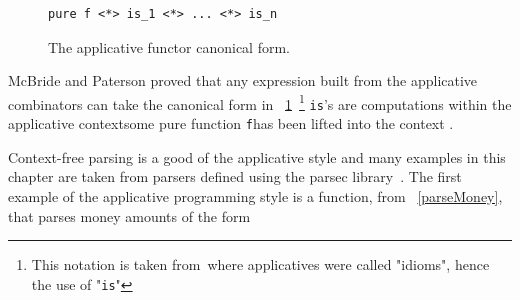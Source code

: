 \begin{figure}[t]
\begin{lstlisting}
pure f <*> is_1 <*> ... <*> is_n
\end{lstlisting}
\caption{The applicative functor \DIFaddbeginFL {}\DIFaddendFL canonical form.}
\label{canonForm}
\end{figure}

McBride and Paterson proved that any expression built from the applicative combinators can take the \DIFdelbegin {}\DIFdelend canonical form in \DIFdelbegin {}\DIFdelend \DIFaddbegin {}\DIFaddend ~\ref{canonForm}~\DIFdelbegin {}\DIFdelend \DIFaddbegin {}\DIFaddend \footnote{This notation is taken from~\DIFdelbegin {}\DIFdelend \DIFaddbegin {}\DIFaddend where applicatives were called "idioms", hence the use of "\texttt{is}"\DIFaddbegin {}\DIFaddend } \DIFdelbegin {}\DIFdelend \DIFaddbegin {}\DIFaddend \texttt{is}'s \DIFaddbegin {}\DIFaddend are computations within the applicative context\DIFdelbegin {}\DIFdelend \DIFaddbegin {}\DIFaddend some pure function \DIFaddbegin {}\DIFaddend \texttt{f}\DIFdelbegin {}\DIFdelend \DIFaddbegin {}\DIFaddend has been lifted into the context \DIFaddbegin {}\texttt{} \DIFaddend . 

Context-free parsing is a good \DIFdelbegin {}\DIFdelend \DIFaddbegin {}\DIFaddend of the applicative style and many examples in this chapter are taken from parsers defined using the parsec library~\DIFdelbegin {}\DIFdelend \DIFaddbegin {}\DIFaddend . The first example of the applicative programming style is a function, from \DIFdelbegin {}\DIFdelend \DIFaddbegin {}\DIFaddend ~\ref{parseMoney}, that parses money amounts of the form\DIFaddbegin \DIFadd{:
 }

